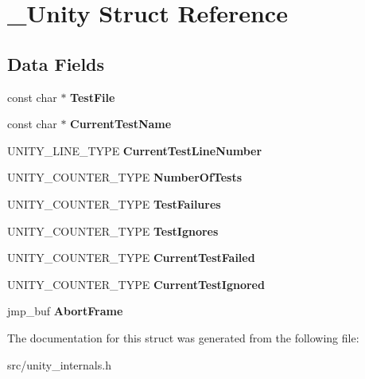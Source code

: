 \hypertarget{struct__Unity}{\section{\+\_\+\+Unity Struct Reference}
\label{struct__Unity}
}
\subsection*{Data Fields}
\begin{DoxyCompactItemize}
\item 
\hypertarget{struct__Unity_a9ee7e59ab860bbcc01b585f85c724298}{const char $\ast$ {\bfseries Test\+File}}\label{struct__Unity_a9ee7e59ab860bbcc01b585f85c724298}

\item 
\hypertarget{struct__Unity_a5dbcf15b6ce38af831a25fc51e6e777f}{const char $\ast$ {\bfseries Current\+Test\+Name}}\label{struct__Unity_a5dbcf15b6ce38af831a25fc51e6e777f}

\item 
\hypertarget{struct__Unity_a00ac8391d19e021577a3351e4b38cc3e}{U\+N\+I\+T\+Y\+\_\+\+L\+I\+N\+E\+\_\+\+T\+Y\+P\+E {\bfseries Current\+Test\+Line\+Number}}\label{struct__Unity_a00ac8391d19e021577a3351e4b38cc3e}

\item 
\hypertarget{struct__Unity_adfa61752987c53cc0743d8dcf0aeb37c}{U\+N\+I\+T\+Y\+\_\+\+C\+O\+U\+N\+T\+E\+R\+\_\+\+T\+Y\+P\+E {\bfseries Number\+Of\+Tests}}\label{struct__Unity_adfa61752987c53cc0743d8dcf0aeb37c}

\item 
\hypertarget{struct__Unity_a88dfa4173b123b8d6d445c27a215aeca}{U\+N\+I\+T\+Y\+\_\+\+C\+O\+U\+N\+T\+E\+R\+\_\+\+T\+Y\+P\+E {\bfseries Test\+Failures}}\label{struct__Unity_a88dfa4173b123b8d6d445c27a215aeca}

\item 
\hypertarget{struct__Unity_a3e4d779b528b5bd2103c719b278c3fb0}{U\+N\+I\+T\+Y\+\_\+\+C\+O\+U\+N\+T\+E\+R\+\_\+\+T\+Y\+P\+E {\bfseries Test\+Ignores}}\label{struct__Unity_a3e4d779b528b5bd2103c719b278c3fb0}

\item 
\hypertarget{struct__Unity_aa371f1a838cb989a3c81f48b30b6dca9}{U\+N\+I\+T\+Y\+\_\+\+C\+O\+U\+N\+T\+E\+R\+\_\+\+T\+Y\+P\+E {\bfseries Current\+Test\+Failed}}\label{struct__Unity_aa371f1a838cb989a3c81f48b30b6dca9}

\item 
\hypertarget{struct__Unity_a320326133842a6b4a2f6f617e1d70467}{U\+N\+I\+T\+Y\+\_\+\+C\+O\+U\+N\+T\+E\+R\+\_\+\+T\+Y\+P\+E {\bfseries Current\+Test\+Ignored}}\label{struct__Unity_a320326133842a6b4a2f6f617e1d70467}

\item 
\hypertarget{struct__Unity_a68b7afb8472d0008f072d8cf8be1fd4d}{jmp\+\_\+buf {\bfseries Abort\+Frame}}\label{struct__Unity_a68b7afb8472d0008f072d8cf8be1fd4d}

\end{DoxyCompactItemize}


The documentation for this struct was generated from the following file\+:\begin{DoxyCompactItemize}
\item 
src/unity\+\_\+internals.\+h\end{DoxyCompactItemize}
